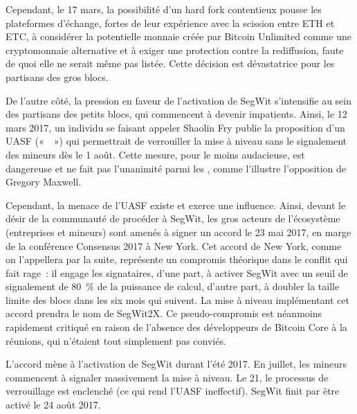 Cependant, le 17 mars, la possibilité d'un hard fork contentieux pousse les plateformes d'échange, fortes de leur expérience avec la scission entre ETH et ETC, à considérer la potentielle monnaie créée par Bitcoin Unlimited comme une cryptomonnaie alternative et à exiger une protection contre la rediffusion, faute de quoi elle ne serait même pas listée. Cette décision est dévastatrice pour les partisans des gros blocs.

De l'autre côté, la pression en faveur de l'activation de SegWit s'intensifie au sein des partisans des petits blocs, qui commencent à devenir impatients. Ainsi, le 12 mars 2017, un individu se faisant appeler Shaolin Fry publie la proposition d'un UASF («~~») qui permettrait de verrouiller la mise à niveau sans le signalement des mineurs dès le 1\ier{} août. Cette mesure, pour le moins audacieuse, est dangereuse et ne fait pas l'unanimité parmi les , comme l'illustre l'opposition de Gregory Maxwell.

Cependant, la menace de l'UASF existe et exerce une influence. Ainsi, devant le désir de la communauté de procéder à SegWit, les gros acteurs de l'écosystème (entreprises et mineurs) sont amenés à signer un accord le 23 mai 2017, en marge de la conférence Consensus 2017 à New York. Cet accord de New York, comme on l'appellera par la suite, représente un compromis théorique dans le conflit qui fait rage~: il engage les signataires, d'une part, à activer SegWit avec un seuil de signalement de 80~\% de la puissance de calcul, d'autre part, à doubler la taille limite des blocs dans les six mois qui suivent. La mise à niveau implémentant cet accord prendra le nom de SegWit2X. Ce pseudo-compromis est néanmoins rapidement critiqué en raison de l'absence des développeurs de Bitcoin Core à la réunions, qui n'étaient tout simplement pas conviés.

L'accord mène à l'activation de SegWit durant l'été 2017. En juillet, les mineurs commencent à signaler massivement la mise à niveau. Le 21, le processus de verrouillage est enclenché (ce qui rend l'UASF ineffectif). SegWit finit par être activé le 24 août 2017.

